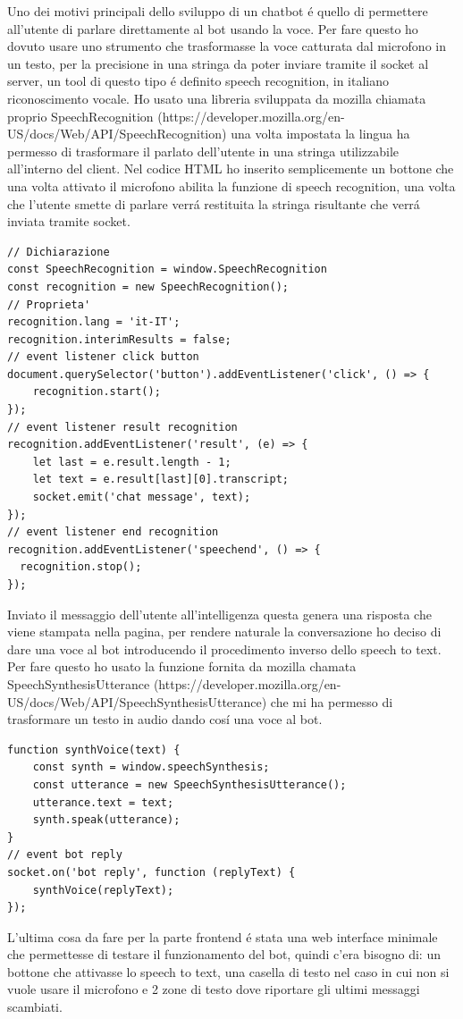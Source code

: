 Uno dei motivi principali dello sviluppo di un chatbot \'e quello di permettere all'utente di parlare direttamente al bot usando la voce. Per fare questo ho dovuto usare uno strumento che trasformasse la voce catturata dal microfono in un testo, per la precisione in una stringa da poter inviare tramite il socket al server, un tool di questo tipo \'e definito speech recognition, in italiano riconoscimento vocale.
Ho usato una libreria sviluppata da mozilla chiamata proprio SpeechRecognition (https://developer.mozilla.org/en-US/docs/Web/API/SpeechRecognition) una volta impostata la lingua ha permesso di trasformare il parlato dell'utente in una stringa utilizzabile all'interno del client. 
Nel codice HTML ho inserito semplicemente un bottone che una volta attivato il microfono abilita la funzione di speech recognition, una volta che l'utente smette di parlare verr\'a restituita la stringa risultante che verr\'a inviata tramite socket.
\begin{lstlisting}
// Dichiarazione
const SpeechRecognition = window.SpeechRecognition
const recognition = new SpeechRecognition();
// Proprieta'
recognition.lang = 'it-IT';
recognition.interimResults = false;
// event listener click button
document.querySelector('button').addEventListener('click', () => {
    recognition.start();
});
// event listener result recognition
recognition.addEventListener('result', (e) => {
    let last = e.result.length - 1; 
    let text = e.result[last][0].transcript;
    socket.emit('chat message', text);
});
// event listener end recognition
recognition.addEventListener('speechend', () => {
  recognition.stop();
});
\end{lstlisting}
Inviato il messaggio dell'utente all'intelligenza questa genera una risposta che viene stampata nella pagina, per rendere naturale la conversazione ho deciso di dare una voce al bot introducendo il procedimento inverso dello speech to text. Per fare questo ho usato la funzione fornita da mozilla chamata SpeechSynthesisUtterance (https://developer.mozilla.org/en-US/docs/Web/API/SpeechSynthesisUtterance) che mi ha permesso di trasformare un testo in audio dando cos\'i una voce al bot.
\begin{lstlisting}
function synthVoice(text) {
    const synth = window.speechSynthesis;
    const utterance = new SpeechSynthesisUtterance();
    utterance.text = text;
    synth.speak(utterance);
}
// event bot reply
socket.on('bot reply', function (replyText) {
    synthVoice(replyText);
});
\end{lstlisting}
L'ultima cosa da fare per la parte frontend \'e stata una web interface minimale che permettesse di testare il funzionamento del bot, quindi c'era bisogno di: un bottone che attivasse lo speech to text, una casella di testo nel caso in cui non si vuole usare il microfono e 2 zone di testo dove riportare gli ultimi messaggi scambiati.
